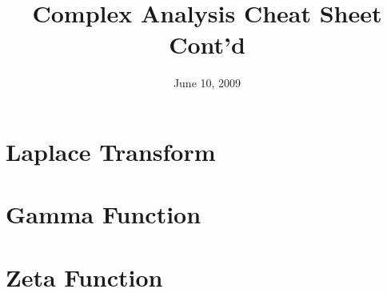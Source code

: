 \documentclass{article}
\title{Complex Analysis Cheat Sheet Cont'd}
\date{June 10, 2009}
\begin{document}
\maketitle
\tableofcontents
\section{Laplace Transform}

\section{Gamma Function}

\section{Zeta Function}

\nocite{*}


\end{document}

